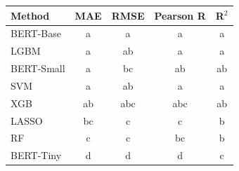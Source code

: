 \begin{tabular}{lcccc}
\toprule
Method & MAE & RMSE & Pearson R & R$^2$ \\
\midrule
BERT-Base & a & a & a & a \\
LGBM & a & ab & a & a \\
BERT-Small & a & bc & ab & ab \\
SVM & a & ab & a & a \\
XGB & ab & abc & abc & ab \\
LASSO & bc & c & c & b \\
RF & c & c & bc & b \\
BERT-Tiny & d & d & d & c \\
\bottomrule
\end{tabular}
